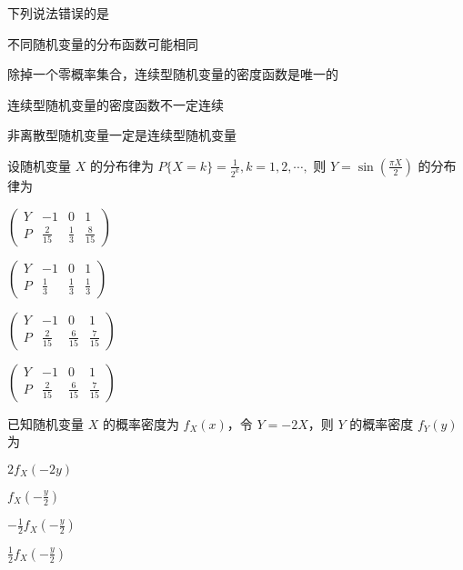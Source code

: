 \documentclass{exam-zh}
\begin{document}
\begin{question}
  下列说法错误的是 \paren[D]
  \begin{choices}
    \item 不同随机变量的分布函数可能相同  
    \item 除掉一个零概率集合，连续型随机变量的密度函数是唯一的  
    \item 连续型随机变量的密度函数不一定连续  
    \item 非离散型随机变量一定是连续型随机变量  
  \end{choices}
\end{question}

\begin{question}
  设随机变量 $X$ 的分布律为  
  $P\{X = k\} = \frac{1}{2^k}, k = 1, 2, \cdots ,$  
  则  
  $Y = \sin\left(\frac{\pi X}{2}\right)$  
  的分布律为 \paren[A]
  \begin{choices}
    \item 
    $
    \begin{pmatrix}
    Y & -1 & 0 & 1 \\
    P & \frac{2}{15} & \frac{1}{3} & \frac{8}{15}
    \end{pmatrix}
    $
    
    \item 
    $
    \begin{pmatrix}
    Y & -1 & 0 & 1 \\
    P & \frac{1}{3} & \frac{1}{3} & \frac{1}{3}
    \end{pmatrix}
    $
    
    \item 
    $
    \begin{pmatrix}
    Y & -1 & 0 & 1 \\
    P & \frac{2}{15} & \frac{6}{15} & \frac{7}{15}
    \end{pmatrix}
    $
    
    \item 
    $
    \begin{pmatrix}
    Y & -1 & 0 & 1 \\
    P & \frac{2}{15} & \frac{6}{15} & \frac{7}{15}
    \end{pmatrix}
    $
  \end{choices}
\end{question}

\begin{question}
  已知随机变量 $X$ 的概率密度为 $f_X(x)$，令 $Y = -2X$，则 $Y$ 的概率密度 $f_Y(y)$ 为 \paren[D]
  \begin{choices}
    \item $2f_X(-2y)$  
    \item $f_X(-\frac{y}{2})$  
    \item $-\frac{1}{2}f_X(-\frac{y}{2})$  
    \item $\frac{1}{2}f_X(-\frac{y}{2})$  
  \end{choices}
\end{question}
\end{document}
